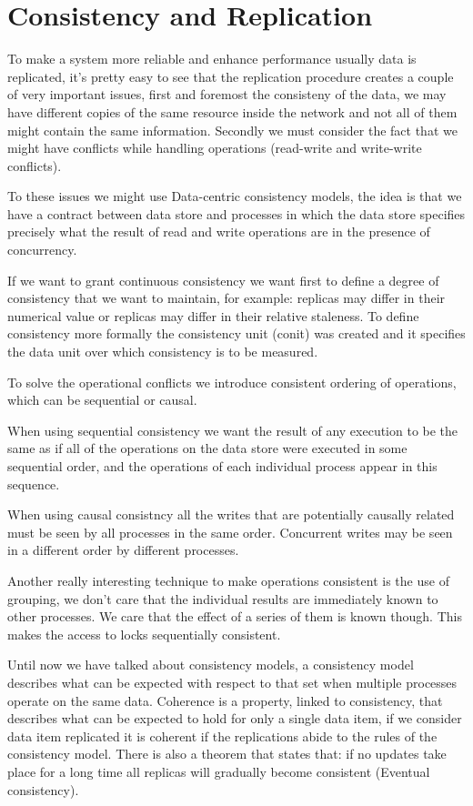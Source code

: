 \chapter{Consistency and Replication}
To make a system more reliable and enhance performance usually data is replicated, it's pretty easy to see that the replication procedure creates a couple of very important issues, first and foremost the consisteny of the data, we may have different copies of the same resource inside the network and not all of them might contain the same information. Secondly we must consider the fact that we might have conflicts while handling operations (read-write and write-write conflicts).

To these issues we might use Data-centric consistency models, the idea is that we have a contract between data store and processes in which the data store specifies precisely what the result of read and write operations are in the presence of concurrency.

If we want to grant continuous consistency we want first to define a degree of consistency that we want to maintain, for example: replicas may differ in their numerical value or replicas may differ in their relative staleness. To define consistency more formally the consistency unit (conit) was created and it specifies the data unit over which consistency is to be measured.

To solve the operational conflicts we introduce consistent ordering of operations, which can be sequential or causal.

When using sequential consistency we want the result of any execution to be the same as if all of the operations on the data store were executed in some sequential order, and the operations of each individual process appear in this sequence.

When using causal consistncy all the writes that are potentially causally related must be seen by all processes in the same order. Concurrent writes may be seen in a different order by different processes.

Another really interesting technique to make operations consistent is the use of grouping, we don't care that the individual results are immediately known to other processes. We care that the effect of a series of them is known though. This makes the access to locks sequentially consistent.

Until now we have talked about consistency models, a consistency model describes what can be expected with respect to that set when multiple processes operate on the same data. Coherence is a property, linked to consistency, that describes what can be expected to hold for only a single data item, if we consider data item replicated it is coherent if the replications abide to the rules of the consistency model. There is also a theorem that states that: if no updates take place for a long time all replicas will gradually become consistent (Eventual consistency).

